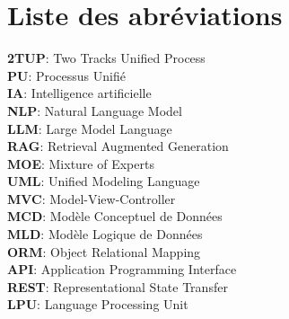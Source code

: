 \thispagestyle{empty}

\chapter*{Liste des abréviations}

\noindent
\vspace{0.5em}
\textbf{2TUP}: Two Tracks Unified Process\\
\vspace{0.5em}
\textbf{PU}: Processus Unifié \\
\vspace{0.5em}
\textbf{IA}: Intelligence artificielle\\ 
\vspace{0.5em}
\textbf{NLP}: Natural Language Model \\
\vspace{0.5em}
\textbf{LLM}: Large Model Language \\
\vspace{0.5em}
\textbf{RAG}: Retrieval Augmented Generation \\
\vspace{0.5em}
\textbf{MOE}: Mixture of Experts \\
\vspace{0.5em}
\textbf{UML}: Unified Modeling Language \\ 
\vspace{0.5em}
\textbf{MVC}: Model-View-Controller \\
\vspace{0.5em}
\textbf{MCD}: Modèle Conceptuel de Données \\ 
\vspace{0.5em}
\textbf{MLD}: Modèle Logique de Données \\
\vspace{0.5em}
\textbf{ORM}: Object Relational Mapping \\
\vspace{0.5em}
\textbf{API}: Application Programming Interface \\
\vspace{0.5em}
\textbf{REST}: Representational State Transfer \\
\vspace{0.5em}
\textbf{LPU}: Language Processing Unit 
